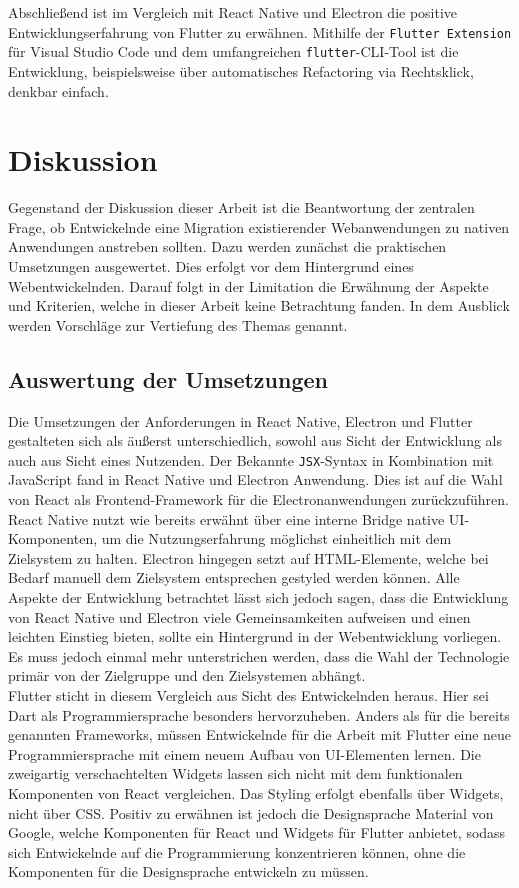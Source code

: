 \documentclass[a4paper]{scrartcl}
\begin{document}
Abschließend ist im Vergleich mit React Native und Electron die positive Entwicklungserfahrung von Flutter zu erwähnen. Mithilfe der \texttt{Flutter Extension} für Visual Studio Code und dem umfangreichen \texttt{flutter}-CLI-Tool ist die Entwicklung, beispielsweise über automatisches Refactoring via Rechtsklick, denkbar einfach.

\newpage

\section{Diskussion}

Gegenstand der Diskussion dieser Arbeit ist die Beantwortung der zentralen Frage, ob Entwickelnde eine Migration existierender Webanwendungen zu nativen Anwendungen anstreben sollten. Dazu werden zunächst die praktischen Umsetzungen ausgewertet. Dies erfolgt vor dem Hintergrund eines Webentwickelnden. Darauf folgt in der Limitation die Erwähnung der Aspekte und Kriterien, welche in dieser Arbeit keine Betrachtung fanden. In dem Ausblick werden Vorschläge zur Vertiefung des Themas genannt.

\subsection{Auswertung der Umsetzungen}

Die Umsetzungen der Anforderungen in React Native, Electron und Flutter gestalteten sich als äußerst unterschiedlich, sowohl aus Sicht der Entwicklung als auch aus Sicht eines Nutzenden. Der Bekannte \texttt{JSX}-Syntax in Kombination mit JavaScript fand in React Native und Electron Anwendung. Dies ist auf die Wahl von React als Frontend-Framework für die Electronanwendungen zurückzuführen. React Native nutzt wie bereits erwähnt über eine interne Bridge native UI-Komponenten, um die Nutzungserfahrung möglichst einheitlich mit dem Zielsystem zu halten. Electron hingegen setzt auf HTML-Elemente, welche bei Bedarf manuell dem Zielsystem entsprechen gestyled werden können. Alle Aspekte der Entwicklung betrachtet lässt sich jedoch sagen, dass die Entwicklung von React Native und Electron viele Gemeinsamkeiten aufweisen und einen leichten Einstieg bieten, sollte ein Hintergrund in der Webentwicklung vorliegen. Es muss jedoch einmal mehr unterstrichen werden, dass die Wahl der Technologie primär von der Zielgruppe und den Zielsystemen abhängt. \\
Flutter sticht in diesem Vergleich aus Sicht des Entwickelnden heraus. Hier sei Dart als Programmiersprache besonders hervorzuheben. Anders als für die bereits genannten Frameworks, müssen Entwickelnde für die Arbeit mit Flutter eine neue Programmiersprache mit einem neuem Aufbau von UI-Elementen lernen. Die zweigartig verschachtelten Widgets lassen sich nicht mit dem funktionalen Komponenten von React vergleichen. Das Styling erfolgt ebenfalls über Widgets, nicht über CSS. Positiv zu erwähnen ist jedoch die Designsprache Material von Google, welche Komponenten für React und Widgets für Flutter anbietet, sodass sich Entwickelnde auf die Programmierung konzentrieren können, ohne die Komponenten für die Designsprache entwickeln zu müssen. \\
\end{document}
